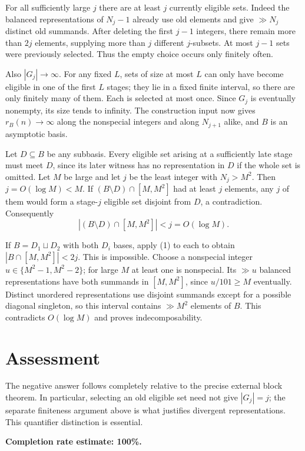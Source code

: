\documentclass[11pt]{article}
\begin{document}
For all sufficiently large $j$ there are at least $j$ currently eligible sets. Indeed the balanced representations of $N_j-1$ already use old elements and give $\gg N_j$ distinct old summands. After deleting the first $j-1$ integers, there remain more than $2j$ elements, supplying more than $j$ different $j$-subsets. At most $j-1$ sets were previously selected. Thus the empty choice occurs only finitely often.

Also $|G_j|\to\infty$. For any fixed $L$, sets of size at most $L$ can only have become eligible in one of the first $L$ stages; they lie in a fixed finite interval, so there are only finitely many of them. Each is selected at most once. Since $G_j$ is eventually nonempty, its size tends to infinity. The construction input now gives $r_B(n)\to\infty$ along the nonspecial integers and along $N_{j+1}$ alike, and $B$ is an asymptotic basis.

Let $D\subseteq B$ be any subbasis. Every eligible set arising at a sufficiently late stage must meet $D$, since its later witness has no representation in $D$ if the whole set is omitted. Let $M$ be large and let $j$ be the least integer with $N_j>M^2$. Then $j=O(\log M)<M$. If $(B\setminus D)\cap[M,M^2]$ had at least $j$ elements, any $j$ of them would form a stage-$j$ eligible set disjoint from $D$, a contradiction. Consequently
\[
 |(B\setminus D)\cap[M,M^2]|<j=O(\log M).\tag{1}
\]

If $B=D_1\sqcup D_2$ with both $D_i$ bases, apply (1) to each to obtain $|B\cap[M,M^2]|<2j$. This is impossible. Choose a nonspecial integer $u\in\{M^2-1,M^2-2\}$; for large $M$ at least one is nonspecial. Its $\gg u$ balanced representations have both summands in $[M,M^2]$, since $u/101\ge M$ eventually. Distinct unordered representations use disjoint summands except for a possible diagonal singleton, so this interval contains $\gg M^2$ elements of $B$. This contradicts $O(\log M)$ and proves indecomposability.

\section*{Assessment}
The negative answer follows completely relative to the precise external block theorem. In particular, selecting an old eligible set need not give $|G_j|=j$; the separate finiteness argument above is what justifies divergent representations. This quantifier distinction is essential.

\textbf{Completion rate estimate: 100\%.}
\end{document}
